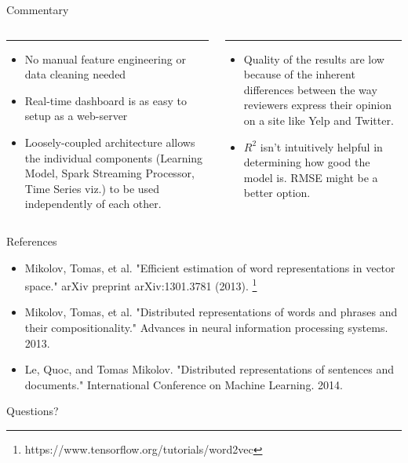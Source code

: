 \documentclass[aspectratio=169]{beamer}
\begin{document}
\begin{frame}{Commentary}
	\begin{columns}[T] %
		\begin{column}{.48\textwidth}
			\color{tropicalrainforest}\rule{\linewidth}{4pt}
			\begin{itemize}
				\item No manual feature engineering or data cleaning needed
				\item Real-time dashboard is as easy to setup as a web-server
				\item Loosely-coupled architecture allows the individual components (Learning Model, Spark Streaming Processor, Time Series viz.) to be used independently of each other.
			\end{itemize}
		\end{column}
		\hfill
		\begin{column}{.48\textwidth}
			\color{usccardinal}\rule{\linewidth}{4pt}
			\begin{itemize}
				\item Quality of the results are low because of the inherent differences between the way reviewers express their opinion on a site like Yelp and Twitter.
				\item $R^2$ isn't intuitively helpful in determining how good the model is. RMSE might be a better option.
			\end{itemize}
		\end{column}
	\end{columns}
\end{frame}

\begin{frame}{References}
	\begin{itemize}
		\item Mikolov, Tomas, et al. "Efficient estimation of word representations in vector space." arXiv preprint arXiv:1301.3781 (2013). \footnote{https://www.tensorflow.org/tutorials/word2vec}
		\item Mikolov, Tomas, et al. "Distributed representations of words and phrases and their compositionality." Advances in neural information processing systems. 2013.
		\item Le, Quoc, and Tomas Mikolov. "Distributed representations of sentences and documents." International Conference on Machine Learning. 2014.
	\end{itemize}
\end{frame}

\begin{frame}
	\centering
	\Huge{Questions?}
\end{frame}
\end{document}

